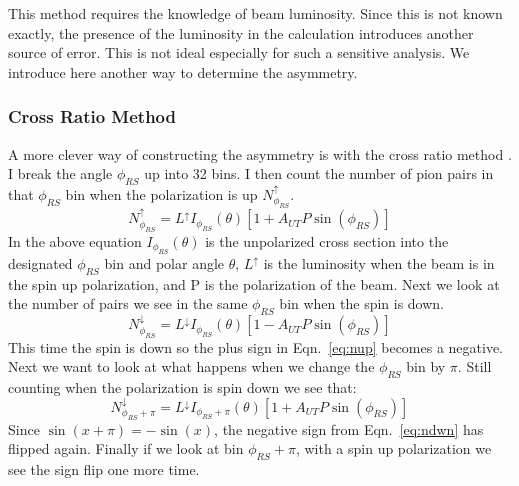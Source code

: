 \documentclass[letterpaper, abstract = on,listof=totoc, bibliography=totoc]{scrreprt}
\begin{document}
This method requires the knowledge of beam luminosity. Since this is not known exactly, the presence of the luminosity in the calculation introduces another source of error. This is not ideal especially for such a sensitive analysis. We introduce here another way to determine the asymmetry.   

\subsubsection{Cross Ratio Method}

A more clever way of constructing the asymmetry is with the cross ratio method \cite{crossRatio}. I break the angle $\phi_{RS}$ up into 32 bins. I then count the number of pion pairs in that $\phi_{RS}$ bin when the polarization is up $N^\uparrow_{\phi_{RS}}$. 
\begin{equation}
\label{eq:nup}
N^\uparrow_{\phi_{RS}} = L^\uparrow I_{\phi_{RS}}(\theta)\left[1+A_{UT}P\sin(\phi_{RS})\right]
\end{equation}
In the above equation $I_{\phi_{RS}}(\theta)$ is the unpolarized cross section into the designated $\phi_{RS}$ bin and polar angle $\theta$, $L^\uparrow$ is the luminosity when the beam is in the spin up polarization, and P is the polarization of the beam. 
Next we look at the number of pairs we see in the same $\phi_{RS}$ bin when the spin is down.
\begin{equation}
\label{eq:ndwn}
N^\downarrow_{\phi_{RS}} = L^\downarrow I_{\phi_{RS}}(\theta)\left[1-A_{UT}P\sin(\phi_{RS})\right]
\end{equation}
This time the spin is down so the plus sign in Eqn.~\ref{eq:nup} becomes a negative. 
Next we want to look at what happens when we change the $\phi_{RS}$ bin by $\pi$. Still counting when the polarization is spin down we see that:
\begin{equation}
\label{eq:ndwnphi}
N^\downarrow_{\phi_{RS}+\pi} = L^\downarrow I_{\phi_{RS}+\pi}(\theta)\left[1+A_{UT}P\sin(\phi_{RS})\right]
\end{equation}
Since $\sin(x+\pi) = -\sin(x)$, the negative sign from Eqn.~\ref{eq:ndwn} has flipped again. Finally if we look at bin $\phi_{RS} + \pi$, with a spin up polarization we see the sign flip one more time. 
\end{document}
